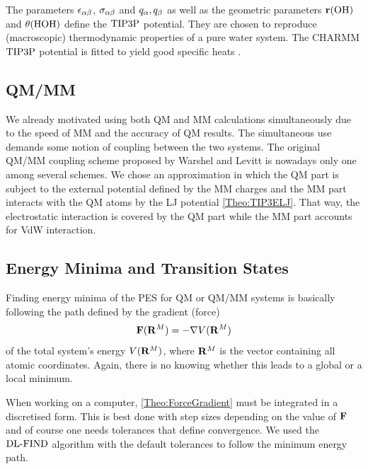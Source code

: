 \documentclass[8.5pt,twoside,twocolumn]{article}
\newcommand\dlfind{\enmat{\te{DL-FIND}}}
\renewcommand\r{\bo r}
\theoremstyle{standard}
\begin{document}
The parameters $\epsilon_{\alpha\beta}$, $\sigma_{\alpha\beta}$ and $q_{\alpha}, q_{\beta}$ as well as the geometric parameters
$\r(\te{OH})$ and $\theta(\text{HOH})$ define the $\text{TIP3P}$ potential. They are chosen to reproduce
(macroscopic) thermodynamic properties of a pure water system.
The CHARMM $\text{TIP3P}$
potential is fitted to yield good specific heats \cite{MacKerell1998CHARMMTIP3}.  

\subsection{QM/MM}
\label{Sec:Theo:QMMM}

We already motivated using both QM and MM calculations simultaneously due to
the speed of MM and the accuracy of QM results. The simultaneous use
demands some notion of coupling between the two systems. The original
QM/MM coupling scheme proposed by Warshel and Levitt \cite{Warshel1976QMMM}
is nowadays only one among several schemes.
We chose an approximation
in which the QM part is subject to the external potential defined
by the MM charges and the MM part interacts with the QM atoms by
the LJ potential \eqref{Theo:TIP3ELJ}. That way, the electrostatic
interaction is covered by the QM part while the MM part accounts for
VdW interaction.

\subsection{Energy Minima and Transition States}
\label{Sec:Theo:Minima}
Finding energy minima of the PES for QM or QM/MM systems is basically following
the path defined by the gradient (force)
\newcommand\RM{\enmat{\bo R^M}}
\begin{equation}
\bo F(\RM)=-\nabla V(\RM)
\label{Theo:ForceGradient}
\end{equation}
of the total system's energy $V(\RM)$, where $\RM$ is the vector containing
all atomic coordinates. Again, there is no knowing whether this leads to
a global or a local minimum.


When working on a computer, \eqref{Theo:ForceGradient} must be integrated
in a discretised form. This is best done with step sizes depending on the
value of $\mathbf{F}$ and of course one needs tolerances that define convergence.
We used the $\dlfind$ algorithm \cite{Kaestner2009} with the default tolerances
to follow the minimum energy path.
\end{document}
